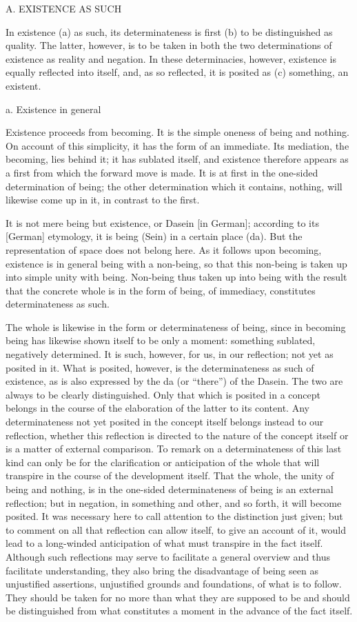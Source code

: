 
A. EXISTENCE AS SUCH

In existence
(a) as such, its determinateness is first
(b) to be distinguished as quality.
The latter, however, is to be taken in
both the two determinations of
existence as reality and negation.
In these determinacies, however,
existence is equally reflected into itself,
and, as so reflected, it is posited as
(c) something, an existent.

a. Existence in general

Existence proceeds from becoming.
It is the simple oneness of being and nothing.
On account of this simplicity, it has the form of an immediate.
Its mediation, the becoming, lies behind it;
it has sublated itself,
and existence therefore appears as a first
from which the forward move is made.
It is at first in the one-sided determination of being;
the other determination which it contains, nothing,
will likewise come up in it,
in contrast to the first.

It is not mere being but existence,
or Dasein [in German];
according to its [German] etymology,
it is being (Sein) in a certain place (da).
But the representation of space does not belong here.
As it follows upon becoming, existence is
in general being with a non-being,
so that this non-being is taken up
into simple unity with being.
Non-being thus taken up into being
with the result that the concrete whole is
in the form of being, of immediacy,
constitutes determinateness as such.

The whole is likewise in the form or determinateness of being,
since in becoming being has likewise shown itself to be only a moment:
something sublated, negatively determined.
It is such, however, for us, in our reflection;
not yet as posited in it.
What is posited, however, is
the determinateness as such of existence,
as is also expressed by the da (or “there”) of the Dasein.
The two are always to be clearly distinguished.
Only that which is posited in a concept belongs in the course of
the elaboration of the latter to its content.
Any determinateness not yet posited in the concept itself
belongs instead to our reflection,
whether this reflection is directed to
the nature of the concept itself
or is a matter of external comparison.
To remark on a determinateness
of this last kind can only be
for the clarification or anticipation of the whole
that will transpire in the course of the development itself.
That the whole, the unity of being and nothing,
is in the one-sided determinateness of being
is an external reflection;
but in negation, in something and other,
and so forth, it will become posited.
It was necessary here to call attention to
the distinction just given;
but to comment on all that reflection can allow itself,
to give an account of it,
would lead to a long-winded anticipation
of what must transpire in the fact itself.
Although such reflections may
serve to facilitate a general overview
and thus facilitate understanding,
they also bring the disadvantage of
being seen as unjustified assertions,
unjustified grounds and foundations,
of what is to follow.
They should be taken for no more than
what they are supposed to be
and should be distinguished from
what constitutes a moment in
the advance of the fact itself.

